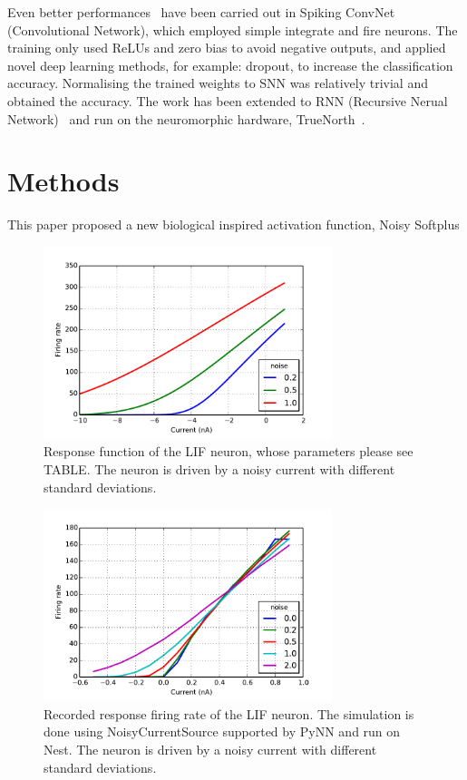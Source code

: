 \documentclass[runningheads,a4paper]{llncs}
\begin{document}
Even better performances~\cite{cao2015spiking,diehl2015fast} have been carried out in Spiking ConvNet (Convolutional Network), which employed simple integrate and fire neurons.
The training only used ReLUs and zero bias to avoid negative outputs, and applied novel deep learning methods, for example: dropout, to increase the classification accuracy.
Normalising the trained weights to SNN was relatively trivial and obtained the accuracy.
The work has been extended to RNN (Recursive Nerual Network)~\cite{diehl2016conversion} and run on the neuromorphic hardware, TrueNorth~\cite{merolla2014million}.
 

\section{Methods}
This paper proposed a new biological inspired activation function, Noisy Softplus
\begin{figure}[bt!]
	\centering
	\includegraphics[width=0.75\textwidth]{pic/1.pdf}
	\caption{
	Response function of the LIF neuron, whose parameters please see TABLE.
	The neuron is driven by a noisy current with different standard deviations. }
	\label{fig:physics}	
\end{figure}

\begin{figure}[bt!]
	\centering
	\includegraphics[width=0.75\textwidth]{pic/2.pdf}
	\caption{
	Recorded response firing rate of the LIF neuron.
	The simulation is done using NoisyCurrentSource supported by PyNN and run on Nest.
	The neuron is driven by a noisy current with different standard deviations. }
	\label{fig:lif_curr}	
\end{figure}
\end{document}
